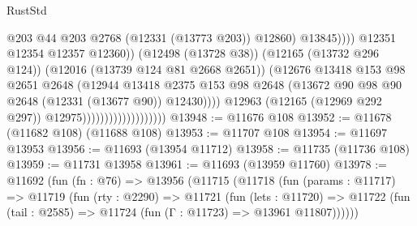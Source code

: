 \begin{lexlean}{RustStd}
\begin{coremodule}
                                                          @203
                                                          @44
                                                          @203
                                                          @2768
                                                          (@12331 (@13773 @203))
                                                          @12860)
                                                        @13845))))
                                                @12351
                                                @12354
                                                @12357
                                                @12360))
                                            (@12498 (@13728 @38))
                                            (@12165 (@13732 @296 @124))
                                            (@12016 (@13739 @124 @81 @2668 @2651))
                                            (@12676
                                              @13418
                                              @153
                                              @98
                                              @2651
                                              @2648
                                              (@12944
                                                @13418
                                                @2375
                                                @153
                                                @98
                                                @2648
                                                (@13672
                                                  @90
                                                  @98
                                                  @90
                                                  @2648
                                                  (@12331 (@13677 @90))
                                                  @12430))))
                                          @12963
                                          (@12165 (@12969 @292 @297))
                                          @12975)))))))))))))))))))
@13948 := @11676 @108
@13952 := @11678 (@11682 @108) (@11688 @108)
@13953 := @11707 @108
@13954 := @11697 @13953
@13956 := @11693 (@13954 @11712)
@13958 := @11735 (@11736 @108)
@13959 := @11731 @13958
@13961 := @11693 (@13959 @11760)
@13978 := @11692
    (fun (fn : @76) =>
    @13956
      (@11715
        (@11718
          (fun (params : @11717) =>
          @11719
            (fun (rty : @2290) =>
            @11721
              (fun (lets : @11720) =>
              @11722 (fun (tail : @2585) => @11724 (fun (Γ : @11723) => @13961 @11807))))))

\end{coremodule}
\end{lexlean}
